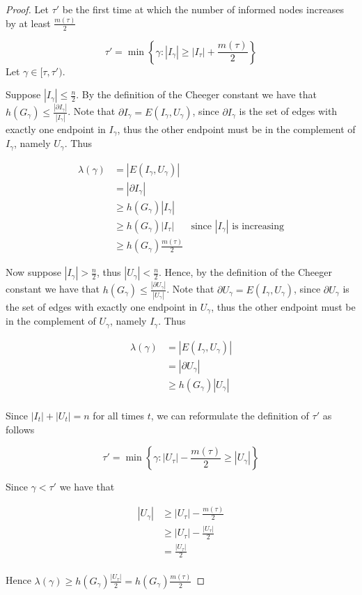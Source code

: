 \begin{proof}

	Let $\tau'$ be the first time at which the number of informed nodes increases by at least $\frac{m(\tau)}{2}$ 
	
	$$
		\tau' = \min\left\{\gamma : |I_{\gamma}| \geq |I_\tau| + \frac{m(\tau)}{2}\right\}
	$$
	Let $ \gamma \in [\tau, \tau')$.

	Suppose  $|I_\gamma| \leq \frac{n}{2}$. By the definition of the Cheeger constant we have that $h(G_\gamma) \leq \frac{|\partial I_\gamma|}{|I_\gamma|}$. Note that $ \partial I_\gamma = E(I_\gamma, U_\gamma)$, since $\partial I_\gamma$ is the set of edges with exactly one endpoint in $I_\gamma$, thus the other endpoint must be in the complement of $I_\gamma$, namely $U_\gamma$. Thus

	\begin{align*}
		\lambda(\gamma) &= |E(I_\gamma, U_\gamma)| \\
		& = |\partial I_\gamma| \\
		& \geq h(G_\gamma) |I_\gamma| \\
		& \geq h(G_\gamma) |I_\tau| & \text{since } |I_\gamma| \text{ is increasing} \\
		& \geq h(G_\gamma) \frac{m(\tau)}{2}
	\end{align*}
		
	Now suppose $|I_\gamma| > \frac{n}{2}$, thus $|U_\gamma| < \frac{n}{2}$. Hence, by the definition of the Cheeger constant we have that $h(G_\gamma) \leq \frac{|\partial U_\gamma|}{|U_\gamma|}$. Note that $ \partial U_\gamma = E(I_\gamma, U_\gamma)$, since $\partial U_\gamma$ is the set of edges with exactly one endpoint in $U_\gamma$,  thus the other endpoint must be in the complement of $U_\gamma$, namely $I_\gamma$. Thus 

	\begin{align*}
		\lambda(\gamma) &= |E(I_\gamma, U_\gamma)| \\
		& = |\partial U_\gamma| \\
		& \geq h(G_\gamma) |U_\gamma| \\
	\end{align*} 

	Since $|I_t| + |U_t| = n$ for all times $t$, we can reformulate the definition of $\tau'$ as follows

	$$
		\tau' = \min \left\{ \gamma : |U_\tau| - \frac{m(\tau)}{2} \geq |U_\gamma| \right\} 
	$$ 
	
	Since $\gamma < \tau'$ we have that

	\begin{align*}
		|U_\gamma| & \geq |U_\tau| - \frac{m(\tau)}{2} \\
		& \geq |U_\tau| - \frac{|U_\tau|}{2} \\
		& = \frac{|U_\tau|}{2} \\
	\end{align*}
	
	Hence $\lambda(\gamma) \geq h(G_\gamma)\frac{|U_\tau|}{2} = h(G_\gamma)\frac{m(\tau)}{2}$

\end{proof}


